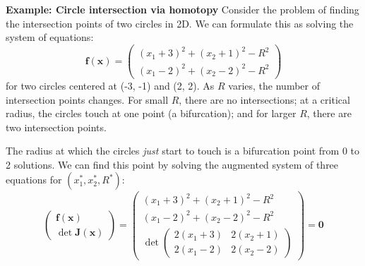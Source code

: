 \begin{exampleBox}
    \textbf{Example: Circle intersection via homotopy}
    Consider the problem of finding the intersection points of two circles in 2D. We can formulate this as solving the system of equations:
    \[
    \mathbf f(\mathbf x) = \begin{pmatrix} (x_1 + 3)^2 + (x_2 + 1)^2 - R^2 \\ (x_1 - 2)^2 + (x_2 - 2)^2 - R^2 \end{pmatrix}
    \]
    for two circles centered at (-3, -1) and (2, 2). As $R$ varies, the number of intersection points changes. For small $R$, there are no intersections; at a critical radius, the circles touch at one point (a bifurcation); and for larger $R$, there are two intersection points.

    \begin{center}
    \end{center}   

    The radius at which the circles \emph{just} start to touch is a bifurcation point from 0 to 2 solutions. We can find this point by solving the augmented system of three equations for $(x_1^*, x_2^*, R^*)$:
    \[ 
    \begin{pmatrix} \mathbf f(\mathbf x) \\ \det \mathbf{J}(\mathbf x) \end{pmatrix} = \begin{pmatrix}
    (x_1 + 3)^2 + (x_2 + 1)^2 - R^2 \\ (x_1 - 2)^2 + (x_2 - 2)^2 - R^2 \\ \det \begin{pmatrix} 2 (x_1 + 3) & 2 ( x_2 + 1) \\ 2 (x_1 - 2) & 2 (x_2 - 2) \end{pmatrix}
    \end{pmatrix} = \mathbf 0
    \]




\end{exampleBox}
